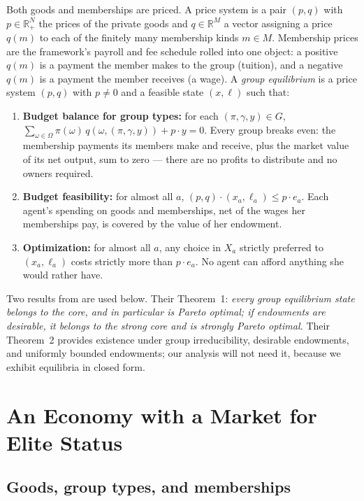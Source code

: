 \documentclass[12pt,letterpaper]{article}
\theoremstyle{definition}
\newcommand{\R}{\mathbb{R}}
\begin{document}
Both goods and memberships are priced.
A price system is a pair $(p,q)$ with $p\in\R^N_+$ the prices of the private goods and $q\in\R^{M}$ a vector assigning a price $q(m)$ to each of the finitely many membership kinds $m\in M$.
Membership prices are the framework's payroll and fee schedule rolled into one object: a positive $q(m)$ is a payment the member makes to the group (tuition), and a negative $q(m)$ is a payment the member receives (a wage).
A \emph{group equilibrium} is a price system $(p,q)$ with $p\neq 0$ and a feasible state $(x,\ell)$ such that:
\begin{enumerate}
\item \textbf{Budget balance for group types:} for each $(\pi,\gamma,y)\in G$, $\sum_{\omega\in\Omega}\pi(\omega)\,q(\omega,(\pi,\gamma,y)) + p\cdot y = 0$.
Every group breaks even: the membership payments its members make and receive, plus the market value of its net output, sum to zero --- there are no profits to distribute and no owners required.
\item \textbf{Budget feasibility:} for almost all $a$, $(p,q)\cdot(x_a,\ell_a)\leq p\cdot e_a$.
Each agent's spending on goods and memberships, net of the wages her memberships pay, is covered by the value of her endowment.
\item \textbf{Optimization:} for almost all $a$, any choice in $X_a$ strictly preferred to $(x_a,\ell_a)$ costs strictly more than $p\cdot e_a$.
No agent can afford anything she would rather have.
\end{enumerate}

Two results from \citet{ellickson2006organization} are used below.
Their Theorem~1: \emph{every group equilibrium state belongs to the core, and in particular is Pareto optimal; if endowments are desirable, it belongs to the strong core and is strongly Pareto optimal.}
Their Theorem~2 provides existence under group irreducibility, desirable endowments, and uniformly bounded endowments; our analysis will not need it, because we exhibit equilibria in closed form.

\section{An Economy with a Market for Elite Status}\label{sec:model}

\subsection{Goods, group types, and memberships}
\end{document}
